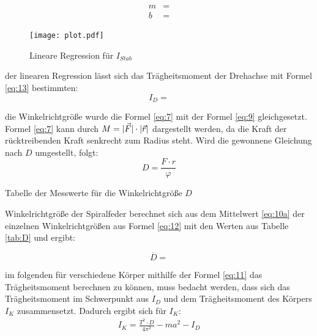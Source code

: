 \begin{subequations}
\begin{align}
m &= \text{}\label{eq:14a}\\
b &= \text{}\label{eq:14b}
\end{align}
\end{subequations}
\newpage

\begin{figure}[H]
    \centering
    \texttt{[image: plot.pdf]}
    \caption{Lineare Regression für $I_{Stab}$}
    \label{fig:1}
\end{figure}


\justifying der linearen Regression lässt sich das Trägheitsmoment der Drehachse mit Formel \eqref{eq:13} bestimmten:
\begin{equation}
I_D = \label{eq:15} %
\end{equation}


\justifying die Winkelrichtgröße wurde die Formel \eqref{eq:7} mit der Formel \eqref{eq:9} gleichgesetzt. Formel \eqref{eq:7} kann durch $M = \lvert\vec{F}\rvert \cdot \lvert\vec{r}\rvert$
dargestellt werden, da die Kraft der rücktreibenden Kraft senkrecht zum Radius steht. Wird die gewonnene Gleichung nach $D$ umgestellt, folgt:
\begin{equation}
D = \frac{F\cdot r}{\varphi}\label{eq:16}
\end{equation}

\begin{table}[H]
    \centering
    
    \caption{Tabelle der Messwerte für die Winkelrichtgröße $D$}
    \label{tab:D}
\end{table}


\justifying Winkelrichtgröße der Spiralfeder berechnet sich aus dem Mittelwert \eqref{eq:10a} der einzelnen Winkelrichtgrößen aus 
Formel \eqref{eq:12} mit den Werten aus Tabelle \ref{tab:D} und ergibt:

\begin{equation}
\overline{D} = \text{} \label{eq:17} %
\end{equation}

 im folgenden für verschiedene Körper mithilfe der Formel \eqref{eq:11} das Trägheitsmoment
berechnen zu können, muss bedacht werden, dass sich das Trägheitsmoment im Schwerpunkt 
aus $I_D$ und dem Trägheitsmoment des Körpers $I_K$ zusammensetzt. Dadurch ergibt sich 
für $I_K$:
\begin{align}
    I_K = \frac{T^2 \cdot D}{4 \pi^2}-ma^2-I_D
\end{align}

